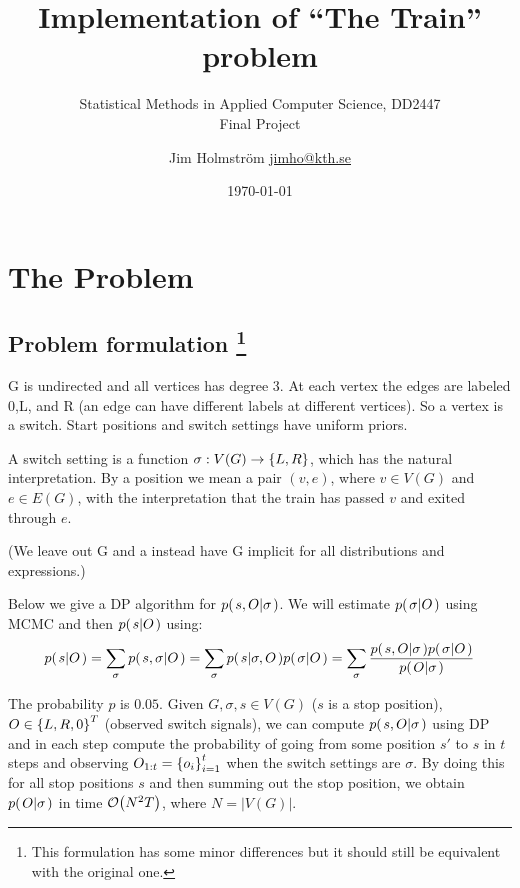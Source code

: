 \documentclass[a4paper,11pt]{kth-mag}
\title{Implementation of ``The Train'' problem}
\subtitle{Statistical Methods in Applied Computer Science, DD2447\\ Final Project}
\author{
    Jim Holmstr\"{o}m \href{mailto:jimho@kth.se}{jimho@kth.se}
}
\date{\today}
\begin{document}
    \frontmatter
    \pagestyle{empty}
    \removepagenumbers
    \maketitle
    \tableofcontents*
    \mainmatter
    \pagestyle{newchap}

    \chapter{The Problem}
        \section[problemformulation]{
            Problem formulation 
            \footnote{
                This formulation has some minor differences but it should still 
                be equivalent with the original one.
            }
        }
        G is undirected and all vertices has degree 3. At each vertex the edges
        are labeled 0,L, and R (an edge can have different labels at different
        vertices). So a vertex is a switch. Start positions and switch settings
        have uniform priors.

        A switch setting is a function $\sigma: V(G)\rightarrow\left\{{L,R}\right\}$, which
        has the natural interpretation. By a position we mean a pair $(v,e)$,
        where $v\in V(G)$ and $e\in E(G)$, with the interpretation that the
        train has passed $v$ and exited through $e$.
        
        (We leave out G and a instead have G implicit for all distributions and expressions.)

        Below we give a DP algorithm for $p{(\left. s,O \middle\vert \sigma \right.)}$. We will
        estimate $p{(\left. \sigma \middle\vert O \right.)}$ using MCMC and then $p{(\left. s \middle\vert O \right.)}$
        using:
        \begin{equation}
            \label{eq:marginalization}
            p{(\left. s \middle\vert O \right.)} 
            = \sum\limits_\sigma
                p{(\left. s,\sigma \middle\vert O \right.)}
            = \sum\limits_\sigma
                p{(\left. s \middle\vert \sigma,O \right.)}p{(\left. \sigma \middle\vert O \right.)}
            = \sum\limits_\sigma
                \frac{
                    p{(\left. s,O \middle\vert \sigma \right.)}p{(\left. \sigma \middle\vert O \right.)}
                }{
                    p{(\left. O \middle\vert \sigma \right.)}
                }
        \end{equation}

    The probability $p$ is $0.05$. Given $G,\sigma,s\in V(G)$ ($s$ is a stop
    position), $O\in\left\{{L,R,0}\right\}^T$ (observed switch signals), we can compute 
    $p{(\left. s,O \middle\vert \sigma \right.)}$ using DP and in each step compute the probability
    of going from some position $s'$ to $s$ in $t$ steps and observing
    $O_{1:t}=\left\{{o_i}\right\}_{i=1}^t$ when the switch settings are $\sigma$. By doing this
    for all stop positions $s$ and then summing out the stop position, we
    obtain $p{(\left. O \middle\vert \sigma \right.)}$ in time $\mathcal{O}{\left(N^2T\right)}$, where $N=|V(G)|$.
\end{document}
